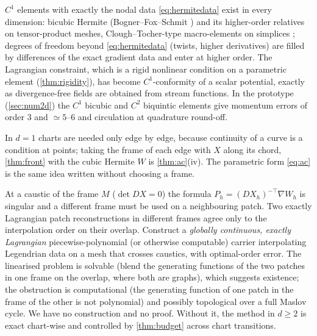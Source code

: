 $C^1$ elements with exactly the nodal data \eqref{eq:hermitedata} exist in every dimension: bicubic Hermite
(Bogner--Fox--Schmit \cite{BFS1965}) and its higher-order relatives on tensor-product meshes, Clough--Tocher-type
macro-elements on simplices \cite{WorseyFarin1987}; degrees of freedom beyond \eqref{eq:hermitedata} (twists, higher
derivatives) are filled by differences of the exact gradient data and enter at higher order. The Lagrangian
constraint, which is a rigid nonlinear condition on a parametric element (\cref{thm:rigidity}), has become
$C^1$-conformity of a scalar potential, exactly as divergence-free fields are obtained from stream functions.
In the prototype (\cref{sec:num2d}) the $C^1$ bicubic and $C^2$ biquintic elements give momentum errors of order
$3$ and $\simeq5$--$6$ and circulation at quadrature round-off.

\begin{remark}
In $d=1$ charts are needed only edge by edge, because continuity of a curve is a condition at points; taking the
frame of each edge with $X$ along its chord, \cref{thm:front} with the cubic Hermite $W$ is \cref{thm:ac}(iv).
The parametric form \eqref{eq:ac} is the same idea written without choosing a frame.
\end{remark}

\begin{problem}\label{prob:glue}
At a caustic of the frame $M$ ($\det DX=0$) the formula $P_h=(DX_h)^{-\top}\nabla W_h$ is singular and a different
frame must be used on a neighbouring patch. Two exactly Lagrangian patch reconstructions in different frames agree
only to the interpolation order on their overlap. Construct a \emph{globally continuous, exactly Lagrangian}
piecewise-polynomial (or otherwise computable) carrier interpolating Legendrian data on a mesh that crosses
caustics, with optimal-order error. The linearised problem is solvable (blend the generating functions of the two
patches in one frame on the overlap, where both are graphs), which suggests existence; the obstruction is
computational (the generating function of one patch in the frame of the other is not polynomial) and possibly
topological over a full Maslov cycle. We have no construction and no proof. Without it, the method in $d\ge2$ is
exact chart-wise and controlled by \cref{thm:budget} across chart transitions.
\end{problem}
